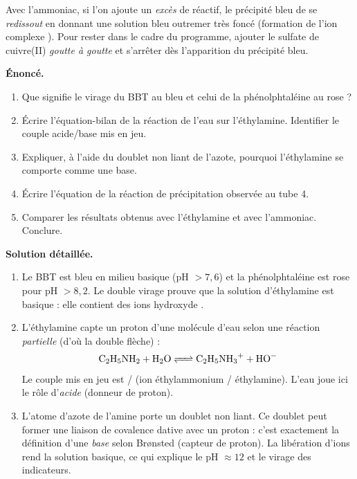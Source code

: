 \documentclass[11pt]{article}
\newcommand{\cle}[1]{{\popxbold\color{popdark}#1}}
\newcounter{popsec}
\newcounter{popsub}
\newcommand{\courssub}[1]{%
  \stepcounter{popsub}%
  \par\vspace{9pt}\noindent{\popxbold\fontsize{11.5}{13}\selectfont\color{popink}{\color{poporange}\thepopsec.\thepopsub}\hspace{6pt}#1}\par\nopagebreak\vspace{4pt}
}
\begin{document}
\begin{attention}
Avec l'ammoniac, si l'on ajoute un \emph{excès} de réactif, le précipité bleu de  se \emph{redissout} en donnant une solution bleu outremer très foncé (formation de l'ion complexe ). Pour rester dans le cadre du programme, ajouter le sulfate de cuivre(II) \emph{goutte à goutte} et s'arrêter dès l'apparition du précipité bleu.
\end{attention}

\courssub{Exploitation}

\begin{exoresolu}
\textbf{Énoncé.}
\begin{enumerate}
\item Que signifie le virage du BBT au bleu et celui de la phénolphtaléine au rose ?
\item Écrire l'équation-bilan de la réaction de l'eau sur l'éthylamine. Identifier le couple acide/base mis en jeu.
\item Expliquer, à l'aide du doublet non liant de l'azote, pourquoi l'éthylamine se comporte comme une base.
\item Écrire l'équation de la réaction de précipitation observée au tube 4.
\item Comparer les résultats obtenus avec l'éthylamine et avec l'ammoniac. Conclure.
\end{enumerate}
\tcblower
\textbf{Solution détaillée.}
\begin{enumerate}
\item Le BBT est bleu en milieu basique (pH $> 7{,}6$) et la phénolphtaléine est rose pour pH $> 8{,}2$. Le double virage prouve que la solution d'éthylamine est \cle{basique} : elle contient des ions hydroxyde .
\item L'éthylamine capte un proton  d'une molécule d'eau selon une réaction \emph{partielle} (d'où la double flèche) :
\[ \ce{C2H5NH2 + H2O <=> C2H5NH3+ + HO-} \]
Le couple mis en jeu est / (ion éthylammonium / éthylamine). L'eau joue ici le rôle d'\emph{acide} (donneur de proton).
\item L'atome d'azote de l'amine porte un \cle{doublet non liant}. Ce doublet peut former une liaison de covalence dative avec un proton  : c'est exactement la définition d'une \emph{base} selon Brønsted (capteur de proton). La libération d'ions  rend la solution basique, ce qui explique le pH $\approx 12$ et le virage des indicateurs.

\end{enumerate}
\end{exoresolu}
\end{document}
